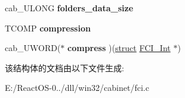\begin{DoxyCompactItemize}
cab\+\_\+\+U\+L\+O\+NG {\bfseries folders\+\_\+data\+\_\+size}
\item 
\mbox{\label{struct_f_c_i___int_a4aa07891d43b7ea946672ce2190e74a2}} 
T\+C\+O\+MP {\bfseries compression}
\item 
\mbox{\label{struct_f_c_i___int_ada35c068dabb8fef0095c03adb04e469}} 
cab\+\_\+\+U\+W\+O\+RD($\ast$ {\bfseries compress} )(\hyperlink{interfacestruct}{struct} \hyperlink{struct_f_c_i___int}{F\+C\+I\+\_\+\+Int} $\ast$)
\end{DoxyCompactItemize}


该结构体的文档由以下文件生成\+:\begin{DoxyCompactItemize}
\item 
E\+:/\+React\+O\+S-\/0../dll/win32/cabinet/fci.\+c\end{DoxyCompactItemize}
